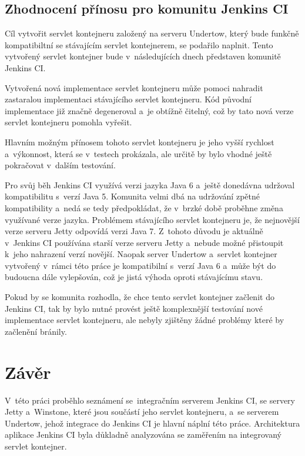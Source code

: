     \section{Zhodnocení přínosu pro komunitu Jenkins CI} \label{kapPrinos}
        Cíl vytvořit servlet kontejneru založený na serveru Undertow, který bude
        funkčně kompatibiltní se stávajícím servlet kontejnerem, se podařilo
        naplnit. Tento vytvořený servlet kontejner bude v~následujících dnech
        představen komunitě Jenkins CI.

        Vytvořená nová implementace servlet kontejneru  
        může pomoci nahradit zastaralou implementaci stávajícího servlet kontejneru.
        Kód původní implementace již značně degeneroval
        a~je obtížně čitelný, což by tato nová verze servlet kontejneru pomohla vyřešit.

        Hlavním možným přínosem tohoto servlet kontejneru je jeho vyšší
        rychlost a~výkonnost, která se v~testech prokázala, ale
        určitě by bylo vhodné ještě pokračovat v~dalším testování.

        Pro svůj běh Jenkins CI využívá verzi jazyka Java 6 a~ještě donedávna
        udržoval kompatibilitu s~verzí Java 5. Komunita
        velmi dbá na udržování zpětné kompatibility
        a~nedá se tedy předpokládat,
        že v~brzké době proběhne změna využívané verze jazyka.
        Problémem stávajícího servlet kontejneru je, že 
        nejnovější verze serveru Jetty odpovídá verzi Java 7.
        Z~tohoto důvodu je aktuálně v~Jenkins CI používána
        starší verze serveru Jetty a~nebude možné přistoupit k~jeho
        nahrazení verzí novější.
        Naopak server Undertow a~servlet kontejner vytvořený v~rámci této práce
        je kompatibilní s~verzí Java 6
        a~může být do budoucna dále vylepšován, což je jistá výhoda oproti stávajícímu
        stavu. 

        Pokud by se komunita rozhodla, že chce tento servlet kontejner
        začlenit do Jenkins CI, tak by bylo nutné provést ještě
        komplexnější testování nové implementace servlet kontejneru, 
        ale nebyly zjištěny žádné
        problémy které by začlenění bránily.
    


\chapter{Závěr}
    V~této práci proběhlo seznámení se~integračním serverem Jenkins CI,
    se servery Jetty a~Winstone, které jsou součástí jeho servlet kontejneru,
    a~se serverem Undertow, jehož integrace do Jenkins CI je hlavní
    náplní této práce. Architektura aplikace Jenkins CI byla
    důkladně analyzována se zaměřením na integrovaný
    servlet kontejner.

